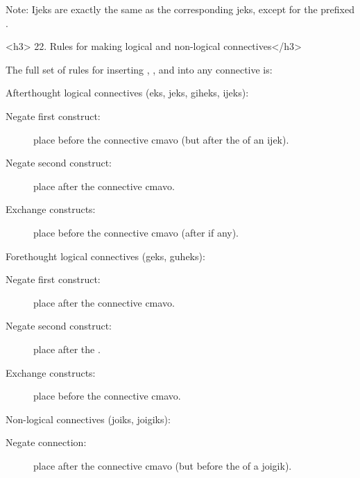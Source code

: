 Note: Ijeks are exactly the same as the corresponding jeks,
    except for the prefixed .

<h3>
22. Rules for making logical and non-logical
    connectives</h3>

The full set of rules for inserting , , and
     into any connective is:

Afterthought logical connectives (eks, jeks, giheks,
    ijeks):

Negate first construct:
\begin{description}
\item[] place  before the connective cmavo (but after the  of an ijek).

\end{description}

Negate second construct:
\begin{description}
\item[] place  after the connective cmavo.

\end{description}

Exchange constructs:
\begin{description}
\item[] place  before the connective cmavo (after  if any).

\end{description}

Forethought logical connectives (geks, guheks):

Negate first construct:
\begin{description}
\item[] place  after the connective cmavo.

\end{description}

Negate second construct:
\begin{description}
\item[] place  after the .

\end{description}

Exchange constructs:
\begin{description}
\item[] place  before the connective cmavo.

\end{description}

Non-logical connectives (joiks, joigiks):

Negate connection:
\begin{description}
\item[] place  after the connective cmavo (but before the  of a joigik).

\end{description}

